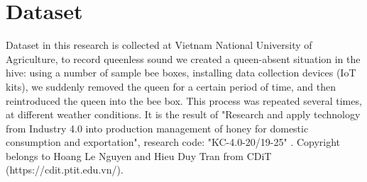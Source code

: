 \section{Dataset}
Dataset in this research is collected at Vietnam National University of Agriculture, to 
record queenless sound we created a queen-absent situation in the hive: using a number of 
sample bee boxes, installing data collection devices (IoT kits), we suddenly removed the 
queen for a certain period of time, and then reintroduced the queen into the bee box. This 
process was repeated several times, at different weather conditions. It is the result of 
"Research and apply technology from Industry 4.0 into production management of honey for 
domestic consumption and exportation", research code: "KC-4.0-20/19-25" \cite{pham2020industry4}. 
Copyright belongs to Hoang Le Nguyen and Hieu Duy Tran from CDiT (https://cdit.ptit.edu.vn/).
